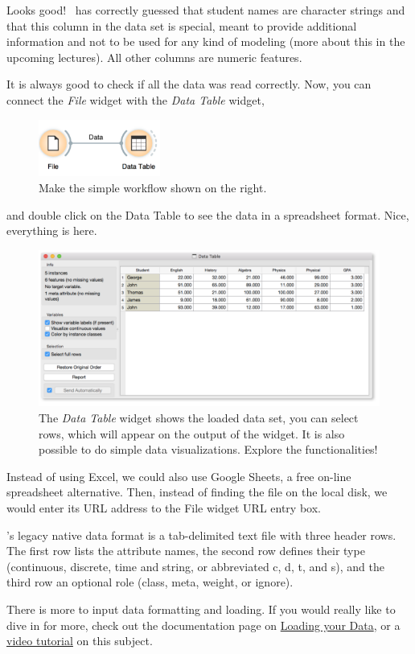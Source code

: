 Looks good! \mutation\ has correctly guessed that student names are character strings and that this column in the data set is special, meant to provide additional information and not to be used for any kind of modeling (more about this in the upcoming lectures). All other columns are numeric features.

It is always good to check if all the data was read correctly. Now, you can connect the \textit{File} widget with the \textit{Data Table} widget,

\begin{figure}[h]
  \centering
  \includegraphics[width=40mm]{graphics/ch-loading_data/loading-fig3.png}%
  \caption{Make the simple workflow shown on the right.}
\label{fig:loading-fig3}
\end{figure}

\noindent and double click on the Data Table to see the data in a spreadsheet format.
Nice, everything is here. 

\begin{figure}[h]
  \centering
  \includegraphics[width=\linewidth]{graphics/ch-loading_data/loading-fig4.png}%
  \caption{The \textit{Data Table} widget shows the loaded data set, you can select rows, which will appear on the output of the widget. It is also possible to do simple data visualizations. Explore the functionalities!}
  \label{fig:loading-fig4}
\end{figure}

Instead of using Excel, we could also use Google Sheets, a free on-line spreadsheet alternative. Then, instead of finding the file on the local disk, we would enter its URL address to the File widget URL entry box.

\mutation’s legacy native data format is a tab-delimited text file with three header rows. The first row lists the attribute names, the second row defines their type (continuous, discrete, time and string, or abbreviated c, d, t, and s), and the third row an optional role (class, meta, weight, or ignore).

There is more to input data formatting and loading. If you would really like to dive in for more, check out the documentation page on \href{https://orange-visual-programming.readthedocs.io/loading-your-data/index.html}{Loading your Data}, or a \href{https://www.youtube.com/watch?v=MHcGdQeYCMg}{video tutorial} on this subject.
